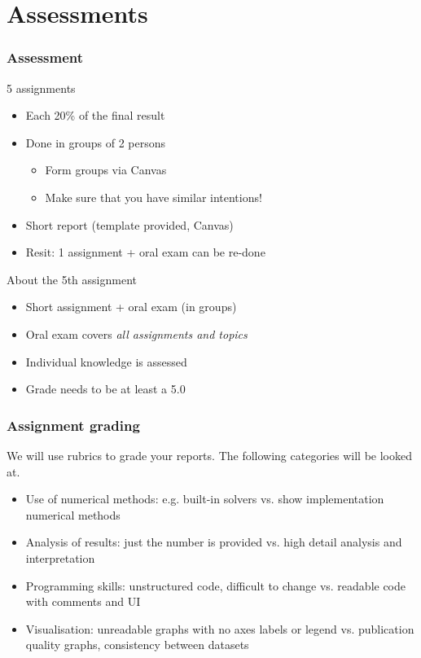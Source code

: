 \documentclass[11pt,table,final,fleqn,xcolor={usenames,dvipsnames},handout]{beamer}
\begin{document}
\section{Assessments}
\begin{frame}
 \frametitle{Assessment}
 \begin{block}{5 assignments}
  \begin{itemize}
    \item Each 20\% of the final result
    \item Done in groups of 2 persons
    \begin{itemize}
      \item Form groups via Canvas
      \item Make sure that you have similar intentions!
    \end{itemize}
    \item Short report (template provided, Canvas)
    \item Resit: 1 assignment + oral exam can be re-done 
  \end{itemize}   
 \end{block}
 \pause
 \begin{block}{About the 5th assignment}
  \begin{itemize}
    \item Short assignment + oral exam (in groups)
    \item Oral exam covers \emph{all assignments and topics}
    \item Individual knowledge is assessed
    \item Grade needs to be at least a 5.0
  \end{itemize}   
 \end{block}
\end{frame} 
\begin{frame}
 \frametitle{Assignment grading}
 We will use rubrics to grade your reports. The following categories will be looked at. \pause
    \begin{itemize}[<+->]
    	\item Use of numerical methods: e.g. built-in solvers vs. show implementation numerical methods
    	\item Analysis of results: just the number is provided vs. high detail analysis and interpretation
    	\item Programming skills: unstructured code, difficult to change vs. readable code with comments and UI
    	\item Visualisation: unreadable graphs with no axes labels or legend vs. publication quality graphs, consistency between datasets
    \end{itemize} 
    \vspace*{2em} \pause
\end{frame}
\end{document}
